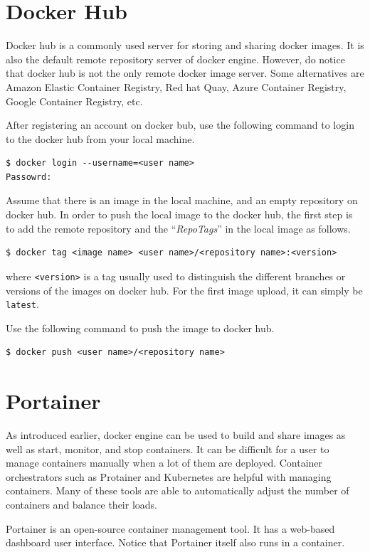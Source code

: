\section{Docker Hub}

Docker hub is a commonly used server for storing and sharing docker images. It is also the default remote repository server of docker engine. However, do notice that docker hub is not the only remote docker image server. Some alternatives are Amazon Elastic Container Registry, Red hat Quay, Azure Container Registry, Google Container Registry, etc.

After registering an account on docker bub, use the following command to login to the docker hub from your local machine.
\begin{lstlisting}
$ docker login --username=<user name>
Passowrd:
\end{lstlisting}

Assume that there is an image in the local machine, and an empty repository on docker hub. In order to push the local image to the docker hub, the first step is to add the remote repository and the ``\textit{RepoTags}'' in the local image as follows.
\begin{lstlisting}
$ docker tag <image name> <user name>/<repository name>:<version>
\end{lstlisting}
where \verb|<version>| is a tag usually used to distinguish the different branches or versions of the images on docker hub. For the first image upload, it can simply be \verb|latest|.

Use the following command to push the image to docker hub.
\begin{lstlisting}
$ docker push <user name>/<repository name>
\end{lstlisting}

\section{Portainer}

As introduced earlier, docker engine can be used to build and share images as well as start, monitor, and stop containers. It can be difficult for a user to manage containers manually when a lot of them are deployed. Container orchestrators such as Protainer and Kubernetes are helpful with managing containers. Many of these tools are able to automatically adjust the number of containers and balance their loads.

Portainer is an open-source container management tool. It has a web-based dashboard user interface. Notice that Portainer itself also runs in a container.

